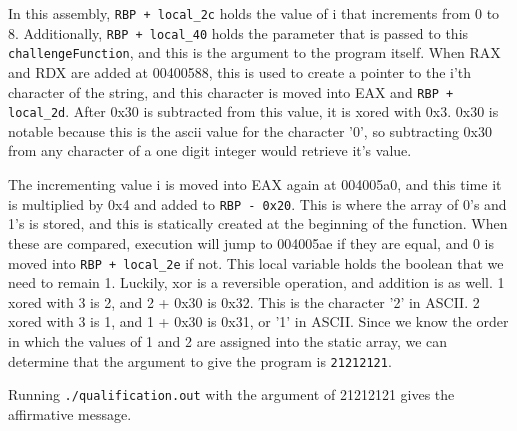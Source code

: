 In this assembly, \texttt{RBP + local_2c} holds the value of i that increments from 0 to 8. Additionally, \texttt{RBP + local_40} holds the parameter that is passed to this \texttt{challengeFunction}, and this is the argument to the program itself. When RAX and RDX are added at 00400588, this is used to create a pointer to the i'th character of the string, and this character is moved into EAX and \texttt{RBP + local_2d}. After 0x30 is subtracted from this value, it is xored with 0x3. 0x30 is notable because this is the ascii value for the character '0', so subtracting 0x30 from any character of a one digit integer would retrieve it's value. 

The incrementing value i is moved into EAX again at 004005a0, and this time it is multiplied by 0x4 and added to \texttt{RBP - 0x20}. This is where the array of 0's and 1's is stored, and this is statically created at the beginning of the function. When these are compared, execution will jump to 004005ae if they are equal, and 0 is moved into \texttt{RBP + local_2e} if not. This local variable holds the boolean that we need to remain 1. Luckily, xor is a reversible operation, and addition is as well. 1 xored with 3 is 2, and 2 + 0x30 is 0x32. This is the character '2' in ASCII. 2 xored with 3 is 1, and 1 + 0x30 is 0x31, or '1' in ASCII. Since we know the order in which the values of 1 and 2 are assigned into the static array, we can determine that the argument to give the program is \texttt{21212121}.

Running \texttt{./qualification.out} with the argument of 21212121 gives the affirmative message.
